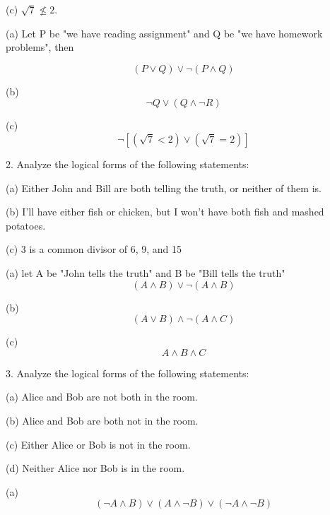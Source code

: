 \documentclass{article}
\begin{document}
\hspace{12pt}(c) $\sqrt{7} \nleq 2$.
\vspace{20pt}

(a) Let P be "we have reading assignment" and Q be "we have homework problems", then

$$(P \lor Q) \lor \neg (P \land Q)$$
\vspace{10pt}

(b) $$\neg Q \lor (Q \land \neg R)$$
\vspace{10pt}

(c) $$\neg [(\sqrt{7} < 2) \lor (\sqrt{7} = 2)]$$
\vspace{40pt}

2. Analyze the logical forms of the following statements:

\hspace{12pt}(a) Either John and Bill are both telling the truth, or neither of them is.

\hspace{12pt}(b) I’ll have either fish or chicken, but I won’t have both fish and mashed
potatoes.

\hspace{12pt}(c) 3 is a common divisor of 6, 9, and 15
\vspace{20pt}

(a) let A be "John tells the truth" and B be "Bill tells the truth"
$$(A \land B) \lor \neg (A \land B)$$
\vspace{10pt}

(b) $$(A \lor B) \land \neg (A \land C)$$
\vspace{10pt}

(c) $$A \land B \land C$$
\vspace{40pt}

3. Analyze the logical forms of the following statements:

\hspace{12pt}(a) Alice and Bob are not both in the room.

\hspace{12pt}(b) Alice and Bob are both not in the room.

\hspace{12pt}(c) Either Alice or Bob is not in the room.

\hspace{12pt}(d) Neither Alice nor Bob is in the room.
\vspace{20pt}

(a) $$(\neg A \land B) \lor (A \land \neg B) \lor (\neg A \land \neg B)$$
\vspace{10pt}
\end{document}
